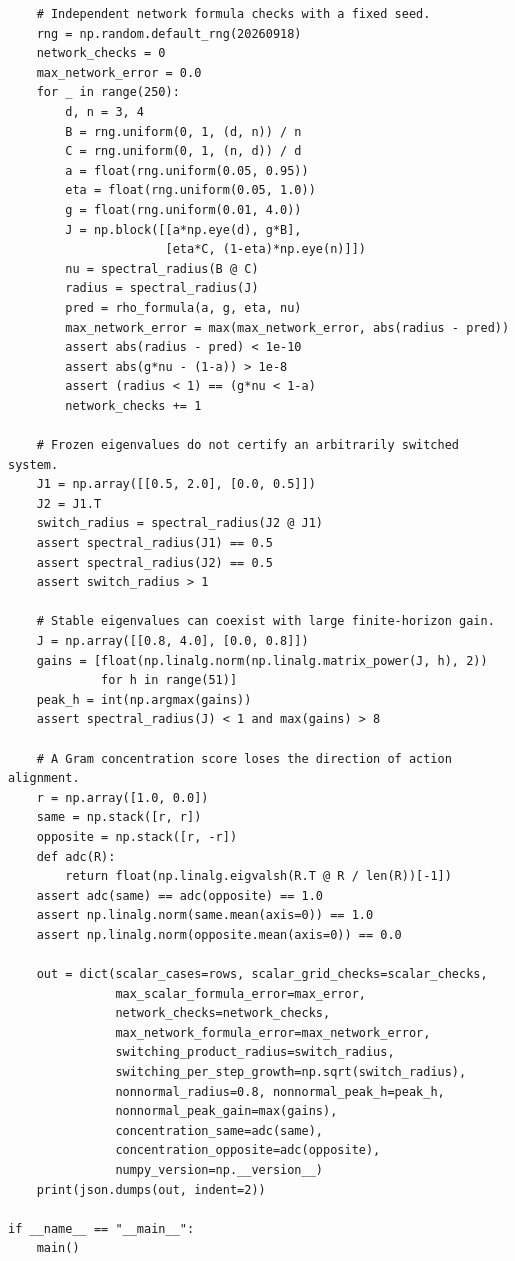 \documentclass[11pt,a4paper]{article}
\theoremstyle{definition}
\theoremstyle{remark}
\begin{document}
\begin{lstlisting}
    # Independent network formula checks with a fixed seed.
    rng = np.random.default_rng(20260918)
    network_checks = 0
    max_network_error = 0.0
    for _ in range(250):
        d, n = 3, 4
        B = rng.uniform(0, 1, (d, n)) / n
        C = rng.uniform(0, 1, (n, d)) / d
        a = float(rng.uniform(0.05, 0.95))
        eta = float(rng.uniform(0.05, 1.0))
        g = float(rng.uniform(0.01, 4.0))
        J = np.block([[a*np.eye(d), g*B],
                      [eta*C, (1-eta)*np.eye(n)]])
        nu = spectral_radius(B @ C)
        radius = spectral_radius(J)
        pred = rho_formula(a, g, eta, nu)
        max_network_error = max(max_network_error, abs(radius - pred))
        assert abs(radius - pred) < 1e-10
        assert abs(g*nu - (1-a)) > 1e-8
        assert (radius < 1) == (g*nu < 1-a)
        network_checks += 1

    # Frozen eigenvalues do not certify an arbitrarily switched system.
    J1 = np.array([[0.5, 2.0], [0.0, 0.5]])
    J2 = J1.T
    switch_radius = spectral_radius(J2 @ J1)
    assert spectral_radius(J1) == 0.5
    assert spectral_radius(J2) == 0.5
    assert switch_radius > 1

    # Stable eigenvalues can coexist with large finite-horizon gain.
    J = np.array([[0.8, 4.0], [0.0, 0.8]])
    gains = [float(np.linalg.norm(np.linalg.matrix_power(J, h), 2))
             for h in range(51)]
    peak_h = int(np.argmax(gains))
    assert spectral_radius(J) < 1 and max(gains) > 8

    # A Gram concentration score loses the direction of action alignment.
    r = np.array([1.0, 0.0])
    same = np.stack([r, r])
    opposite = np.stack([r, -r])
    def adc(R):
        return float(np.linalg.eigvalsh(R.T @ R / len(R))[-1])
    assert adc(same) == adc(opposite) == 1.0
    assert np.linalg.norm(same.mean(axis=0)) == 1.0
    assert np.linalg.norm(opposite.mean(axis=0)) == 0.0

    out = dict(scalar_cases=rows, scalar_grid_checks=scalar_checks,
               max_scalar_formula_error=max_error,
               network_checks=network_checks,
               max_network_formula_error=max_network_error,
               switching_product_radius=switch_radius,
               switching_per_step_growth=np.sqrt(switch_radius),
               nonnormal_radius=0.8, nonnormal_peak_h=peak_h,
               nonnormal_peak_gain=max(gains),
               concentration_same=adc(same),
               concentration_opposite=adc(opposite),
               numpy_version=np.__version__)
    print(json.dumps(out, indent=2))

if __name__ == "__main__":
    main()
\end{lstlisting}
\end{document}
